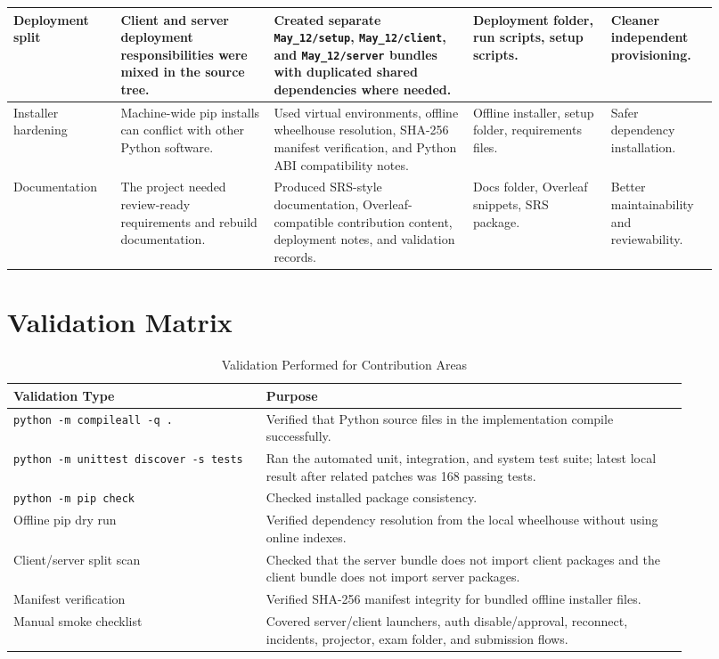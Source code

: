 \documentclass[conference]{IEEEtran}
\begin{document}
\begin{table}[htbp]
\begin{tabular}{P{0.14\linewidth} P{0.20\linewidth} P{0.26\linewidth} P{0.18\linewidth} P{0.14\linewidth}}
\midrule
Deployment split & Client and server deployment responsibilities were mixed in the source tree. & Created separate \texttt{May\_12/setup}, \texttt{May\_12/client}, and \texttt{May\_12/server} bundles with duplicated shared dependencies where needed. & Deployment folder, run scripts, setup scripts. & Cleaner independent provisioning. \\
\midrule
Installer hardening & Machine-wide pip installs can conflict with other Python software. & Used virtual environments, offline wheelhouse resolution, SHA-256 manifest verification, and Python ABI compatibility notes. & Offline installer, setup folder, requirements files. & Safer dependency installation. \\
\midrule
Documentation & The project needed review-ready requirements and rebuild documentation. & Produced SRS-style documentation, Overleaf-compatible contribution content, deployment notes, and validation records. & Docs folder, Overleaf snippets, SRS package. & Better maintainability and reviewability. \\
\bottomrule
\end{tabular}
\label{tab:detailed}
\end{table}

\section{Validation Matrix}

\begin{table}[htbp]
\caption{Validation Performed for Contribution Areas}
\centering
\begin{tabular}{P{0.33\linewidth} P{0.55\linewidth}}
\toprule
\textbf{Validation Type} & \textbf{Purpose} \\
\midrule
\texttt{python -m compileall -q .} & Verified that Python source files in the implementation compile successfully. \\
\midrule
\texttt{python -m unittest discover -s tests} & Ran the automated unit, integration, and system test suite; latest local result after related patches was 168 passing tests. \\
\midrule
\texttt{python -m pip check} & Checked installed package consistency. \\
\midrule
Offline pip dry run & Verified dependency resolution from the local wheelhouse without using online indexes. \\
\midrule
Client/server split scan & Checked that the server bundle does not import client packages and the client bundle does not import server packages. \\
\midrule
Manifest verification & Verified SHA-256 manifest integrity for bundled offline installer files. \\
\midrule
Manual smoke checklist & Covered server/client launchers, auth disable/approval, reconnect, incidents, projector, exam folder, and submission flows. \\
\bottomrule
\end{tabular}
\label{tab:validation}
\end{table}
\end{document}
